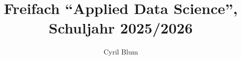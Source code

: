 \let\oldtextbf\textbf

\renewcommand{\textbf}[1]{\oldtextbf{\textcolor{RoyalBlue}{#1}}}

\title{Freifach \enquote{Applied Data Science}, Schuljahr 2025/2026}
\author{Cyril Blum}





\maketitle




